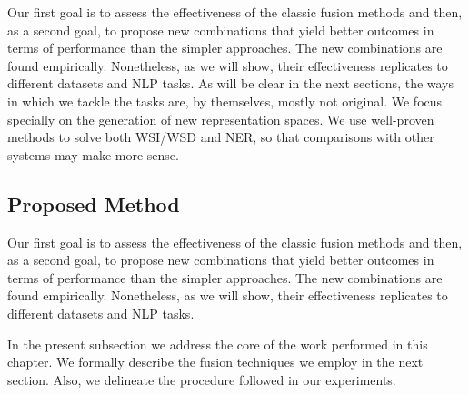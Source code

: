 Our first goal is to assess the effectiveness of the classic fusion methods and then, as a second goal, to propose new combinations that yield better outcomes in terms of performance than the simpler approaches. The new combinations are found empirically. Nonetheless, as we will show, their effectiveness replicates to different datasets and NLP tasks. As will be clear in the next sections, the ways in which we tackle the tasks are, by themselves, mostly not original. We focus specially on the generation of new representation spaces. We use well-proven methods to solve both WSI/WSD and NER, so that comparisons with other systems may make more sense.
%
%



\subsection{Proposed Method}
\label{chap6:application}
 Our first goal is to assess the effectiveness of the classic fusion methods and then, as a second goal, to propose new combinations that yield better outcomes in terms of performance than the simpler approaches. The new combinations are found empirically. Nonetheless, as we will show, their effectiveness replicates to different datasets and NLP tasks. 

In the present subsection we address the core of the work performed in this chapter.
We formally describe the fusion techniques we employ in the next section. Also, we  delineate the procedure followed in our experiments. 


